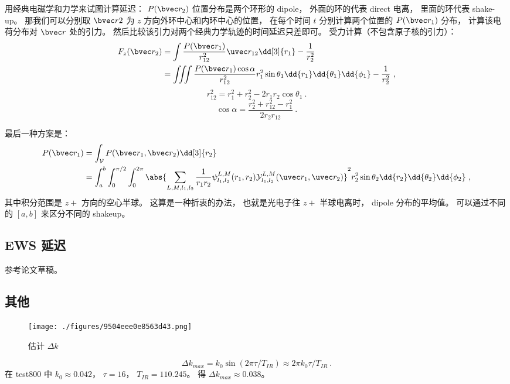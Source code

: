 用经典电磁学和力学来试图计算延迟： $P(\bvec r_2)$ 位置分布是两个环形的 dipole， 外面的环的代表 direct 电离， 里面的环代表 shake-up。 那我们可以分别取 $\bvec r2$ 为 $z$ 方向外环中心和内环中心的位置， 在每个时间 $t$ 分别计算两个位置的 $P(\bvec r_1)$ 分布， 计算该电荷分布对 $\bvec r$ 处的引力。 然后比较该引力对两个经典力学轨迹的时间延迟只差即可。 受力计算（不包含原子核的引力）：
\begin{equation}\label{eq_HeAnal_19}
\begin{aligned}
F_z(\bvec r_2) &= 
\int \frac{P(\bvec r_1)}{r_{12}^2}\uvec r_{12} \dd[3]{r_1} - \frac{1}{r_2^2}\\
&= \iiint \frac{P(\bvec r_1) \cos\alpha}{r_{12}^2} r_1^2\sin\theta_1 \dd{r_1}\dd{\theta_1}\dd{\phi_1} - \frac{1}{r_2^2}~,
\end{aligned}
\end{equation}
\begin{equation}
r_{12}^2 = r_1^2 + r_2^2 - 2r_1r_2 \cos\theta_1~.
\end{equation}
\begin{equation}
\cos\alpha = \frac{r_2^2 + r_{12}^2 - r_1^2}{2r_2 r_{12}}~.
\end{equation}

最后一种方案是：
\begin{equation}\label{eq_HeAnal_26}
\begin{aligned}
P(\bvec r_1) &= \int_{\mathcal V} P(\bvec r_1, \bvec r_2) \dd[3]{r_2}\\
&= \int_a^b  \int_0^{\pi/2} \int_0^{2\pi} \abs{\sum_{L, M, l_1, l_2}  \frac{1}{r_1 r_2} \psi_{l_1, l_2}^{L, M}(r_1, r_2)\mathcal{Y}_{l_1, l_2}^{L, M}(\uvec r_1, \uvec r_2)}^2 r_2^2\sin\theta_2\dd{r_2} \dd{\theta_2} \dd{\phi_2}~,
\end{aligned}
\end{equation}
其中积分范围是 $z+$ 方向的空心半球。 这算是一种折衷的办法， 也就是光电子往 $z+$ 半球电离时， dipole 分布的平均值。 可以通过不同的 $[a, b]$ 来区分不同的 shakeup。

\subsection{EWS 延迟}
参考论文草稿。

\subsection{其他}
\begin{figure}[ht]
\centering
\texttt{[image: ./figures/9504eee0e8563d43.png]}
\caption{估计 $\Delta k$} \label{fig_HeAnal_2}
\end{figure}
\begin{equation}
\Delta k_{max} = k_0 \sin(2\pi \tau/T_{IR}) \approx 2 \pi k_0  \tau/T_{IR}~.
\end{equation}
在 test800 中 $k_0 \approx 0.042$， $\tau = 16$， $T_{IR} = 110.245$。 得 $\Delta k_{max} \approx 0.038$。
